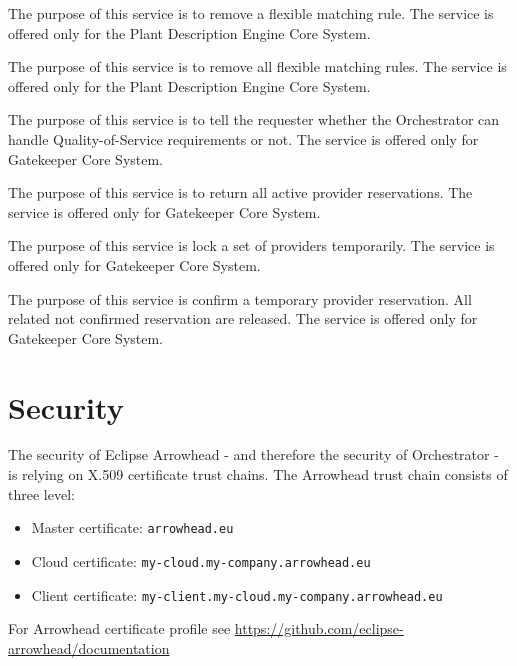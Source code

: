 \documentclass[a4paper]{arrowhead}
\begin{document}
The purpose of this service is to remove a flexible matching rule. The service is offered only for the Plant Description Engine Core System.

The purpose of this service is to remove all flexible matching rules. The service is offered only for the Plant Description Engine Core System.

The purpose of this service is to tell the requester whether the Orchestrator can handle Quality-of-Service requirements or not. The service is offered only for Gatekeeper Core System.

The purpose of this service is to return all active provider reservations. The service is offered only for Gatekeeper Core System. 

The purpose of this service is lock a set of providers temporarily. The service is offered only for Gatekeeper Core System. 

The purpose of this service is confirm a temporary provider reservation. All related not confirmed reservation are released. The service is offered only for Gatekeeper Core System. 

\newpage

\section{Security}
\label{sec:security}

The security of Eclipse Arrowhead - and therefore the security of Orchestrator  - is relying on X.509 certificate trust chains. The Arrowhead trust chain consists of three level:
\begin{itemize}
    \item Master certificate: \texttt{arrowhead.eu}
    \item Cloud certificate: \texttt {my-cloud.my-company.arrowhead.eu}
    \item Client certificate: \texttt{my-client.my-cloud.my-company.arrowhead.eu}
\end{itemize}

For Arrowhead certificate profile see \url{https://github.com/eclipse-arrowhead/documentation}




\newpage
\end{document}
